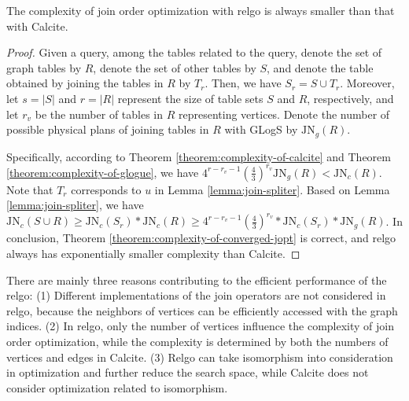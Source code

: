 \begin{theorem}
    \label{theorem:complexity-of-converged-jopt}
    The complexity of join order optimization with relgo is always smaller than that with Calcite.
\end{theorem}
\begin{proof}
    Given a query, among the tables related to the query, denote the set of graph tables by $R$, denote the set of other tables by $S$, and denote the table obtained by joining the tables in $R$ by $T_r$.
    Then, we have $S_r = S \cup T_r$.
    Moreover, let $s = |S|$ and $r = |R|$ represent the size of table sets $S$ and $R$, respectively, and let $r_v$ be the number of tables in $R$ representing vertices.
    Denote the number of possible physical plans of joining tables in $R$ with GLogS by $\text{JN}_g(R)$.
    
    Specifically, according to Theorem \ref{theorem:complexity-of-calcite} and Theorem \ref{theorem:complexity-of-glogue}, we have $4^{r - r_v -1}(\frac{4}{3})^{r_v}\text{JN}_g(R) < \text{JN}_c(R)$.
    Note that $T_r$ corresponds to $u$ in Lemma \ref{lemma:join-spliter}.
    Based on Lemma \ref{lemma:join-spliter}, we have $\text{JN}_c(S \cup R) \geq \text{JN}_c(S_r) * \text{JN}_c(R) \geq 4^{r - r_v -1}(\frac{4}{3})^{r_v} * \text{JN}_c(S_r) * \text{JN}_g(R)$.
    In conclusion, Theorem \ref{theorem:complexity-of-converged-jopt} is correct, and relgo always has exponentially smaller complexity than Calcite.
\end{proof}

There are mainly three reasons contributing to the efficient performance of the relgo:
(1) Different implementations of the join operators are not considered in relgo, because the neighbors of vertices can be efficiently accessed with the graph indices.
(2) In relgo, only the number of vertices influence the complexity of join order optimization, while the complexity is determined by both the numbers of vertices and edges in Calcite.
(3) Relgo can take isomorphism into consideration in optimization and further reduce the search space, while Calcite does not consider optimization related to isomorphism.
